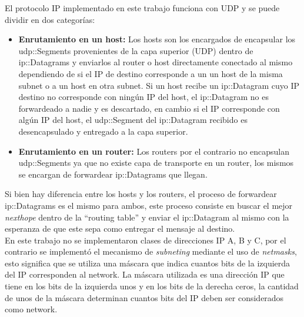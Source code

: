 \documentclass[10pt,a4paper]{article}
\begin{document}
El protocolo IP implementado en este trabajo funciona con UDP y se puede dividir en dos categorías:
\begin{itemize}
\item \textbf{Enrutamiento en un host:} Los hosts son los encargados de encapsular los udp::Segments provenientes de la capa superior (UDP) dentro de ip::Datagrams y enviarlos al router o host directamente conectado al mismo dependiendo de si el IP de destino corresponde a un un host de la misma subnet o a un host en otra subnet. Si un host recibe un ip::Datagram cuyo IP destino no corresponde con ningún IP del host, el ip::Datagram no es forwardeado a nadie y es descartado, en cambio si el IP corresponde con algún IP del host, el udp::Segment del ip::Datagram recibido es desencapsulado y entregado a la capa superior.
\item \textbf{Enrutamiento en un router:} Los routers por el contrario no encapsulan udp::Segments ya que no existe capa de transporte en un router, los mismos se encargan de forwardear ip::Datagrams que llegan.
\end{itemize}

Si bien hay diferencia entre los hosts y los routers, el proceso de forwardear ip::Datagrams es el mismo para ambos, este proceso consiste en buscar el mejor \textit{nexthope} dentro de la ``routing table'' y enviar el ip::Datagram al mismo con la esperanza de que este sepa como entregar el mensaje al destino. \\

En este trabajo no se implementaron clases de direcciones IP A, B y C, por el contrario se implementó el mecanismo de \textit{subneting} mediante el uso de \textit{netmasks}, esto significa que se utiliza una máscara que indica cuantos bits de la izquierda del IP corresponden al network. La máscara utilizada es una dirección IP que tiene en los bits de la izquierda unos y en los bits de la derecha ceros, la cantidad de unos de la máscara determinan cuantos bits del IP deben ser considerados como network. \\
\end{document}
